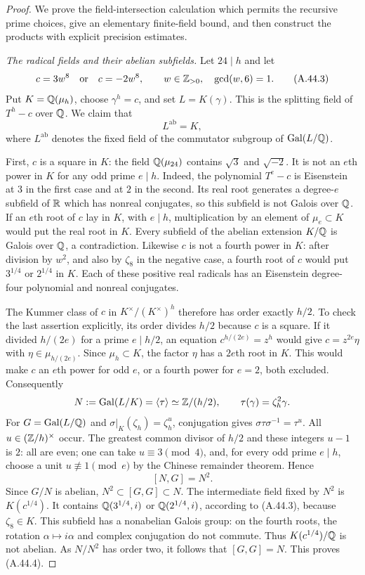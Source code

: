 \begin{proof}
We prove the field-intersection calculation which permits
the recursive prime choices, give an elementary finite-field
bound, and then construct the products with explicit
precision estimates.

\emph{The radical fields and their abelian subfields.}
Let $24\mid h$ and let
\[
 c=3w^8\quad\text{or}\quad c=-2w^8,
 \qquad w\in\mathbb Z_{>0},\quad\gcd(w,6)=1.
 \tag{A.44.3}
\]
Put $K=\mathbb Q(\mu_h)$, choose $\gamma^h=c$, and set
$L=K(\gamma)$. This is the splitting field of $T^h-c$
over $\mathbb Q$. We claim that
\[
                L^{\mathrm{ab}}=K,
 \tag{A.44.4}
\]
where $L^{\mathrm{ab}}$ denotes the fixed field of the
commutator subgroup of $\operatorname{Gal}(L/\mathbb Q)$.

First, $c$ is a square in $K$: the field $\mathbb Q(\mu_{24})$
contains $\sqrt3$ and $\sqrt{-2}$. It is not an $e$th
power in $K$ for any odd prime $e\mid h$. Indeed, the polynomial
$T^e-c$ is Eisenstein at $3$ in the first case and at $2$
in the second. Its real root generates a degree-$e$
subfield of $\mathbb R$ which has nonreal conjugates, so this
subfield is not Galois over $\mathbb Q$. If an $e$th root of $c$
lay in $K$, with $e\mid h$, multiplication by an element
of $\mu_e\subset K$ would put the real root in $K$.
Every subfield of the abelian extension $K/\mathbb Q$ is Galois
over $\mathbb Q$, a contradiction. Likewise $c$ is not a fourth
power in $K$: after division by $w^2$, and also by
$\zeta_8$ in the negative case, a fourth root of $c$
would put $3^{1/4}$ or $2^{1/4}$ in $K$. Each of these
positive real radicals has an Eisenstein degree-four
polynomial and nonreal conjugates.

The Kummer class of $c$ in $K^\times/(K^\times)^h$
therefore has order exactly $h/2$. To check the last
assertion explicitly, its order divides $h/2$ because
$c$ is a square. If it divided $h/(2e)$ for a prime
$e\mid h/2$, an equation $c^{h/(2e)}=z^h$ would give
$c=z^{2e}\eta$ with $\eta\in\mu_{h/(2e)}$.
Since $\mu_h\subset K$, the factor $\eta$ has a
$2e$th root in $K$. This would make $c$ an $e$th power
for odd $e$, or a fourth power for $e=2$, both excluded.
Consequently
\[
 N:=\operatorname{Gal}(L/K)=\langle\tau\rangle
      \simeq\mathbb Z/(h/2),\qquad
 \tau(\gamma)=\zeta_h^2\gamma.
\]
For $G=\operatorname{Gal}(L/\mathbb Q)$ and
$\sigma|_K(\zeta_h)=\zeta_h^u$, conjugation gives
$\sigma\tau\sigma^{-1}=\tau^u$. All
$u\in(\mathbb Z/h)^\times$ occur. The greatest common divisor
of $h/2$ and these integers $u-1$ is $2$: all are even;
one can take $u\equiv3\pmod4$, and, for every odd prime
$e\mid h$, choose a unit $u\not\equiv1\pmod e$ by
the Chinese remainder theorem. Hence
\[
                 [N,G]=N^2.
\]
Since $G/N$ is abelian, $N^2\subset[G,G]\subset N$.
The intermediate field fixed by $N^2$ is
$K(c^{1/4})$. It contains $\mathbb Q(3^{1/4},i)$ or
$\mathbb Q(2^{1/4},i)$, according to (A.44.3), because
$\zeta_8\in K$. This subfield has a nonabelian Galois
group: on the fourth roots, the rotation
$\alpha\mapsto i\alpha$ and complex conjugation do
not commute. Thus $K(c^{1/4})/\mathbb Q$ is not abelian.
As $N/N^2$ has order two, it follows that $[G,G]=N$.
This proves (A.44.4).


\end{proof}
